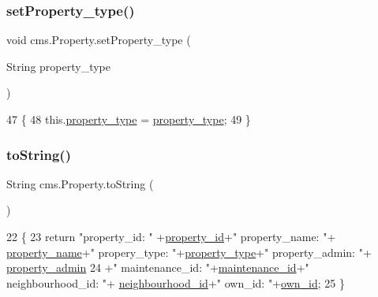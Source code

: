 \subsubsection{\texorpdfstring{set\+Property\+\_\+type()}{setProperty\_type()}}
{\footnotesize\ttfamily void cms.\+Property.\+set\+Property\+\_\+type (\begin{DoxyParamCaption}\item[{String}]{property\+\_\+type }\end{DoxyParamCaption})\hspace{0.3cm}{\ttfamily [inline]}}


\begin{DoxyCode}
47                                                        \{
48         this.\mbox{\hyperlink{classcms_1_1_property_a16bbd8f821050042e83a42d814fc42cc}{property\_type}} = \mbox{\hyperlink{classcms_1_1_property_a16bbd8f821050042e83a42d814fc42cc}{property\_type}};
49     \}
\end{DoxyCode}
\mbox{\label{classcms_1_1_property_a89c15a4d47d9b1ff2870465759e71d35}} 
\subsubsection{\texorpdfstring{to\+String()}{toString()}}
{\footnotesize\ttfamily String cms.\+Property.\+to\+String (\begin{DoxyParamCaption}{ }\end{DoxyParamCaption})\hspace{0.3cm}{\ttfamily [inline]}}


\begin{DoxyCode}
22                             \{
23         \textcolor{keywordflow}{return}  \textcolor{stringliteral}{"property\_id: "} +\mbox{\hyperlink{classcms_1_1_property_a599f759f4e0076578bf5a39c494a978d}{property\_id}}+\textcolor{stringliteral}{" property\_name: "}+
      \mbox{\hyperlink{classcms_1_1_property_a35fcc951b43bfcb151fae422a0a61a1a}{property\_name}}+\textcolor{stringliteral}{" propery\_type: "}+\mbox{\hyperlink{classcms_1_1_property_a16bbd8f821050042e83a42d814fc42cc}{property\_type}}+\textcolor{stringliteral}{" property\_admin: "}+
      \mbox{\hyperlink{classcms_1_1_property_a24082a4e64c157c5ef3b9238f58dba4c}{property\_admin}}
24                 +\textcolor{stringliteral}{" maintenance\_id: "}+\mbox{\hyperlink{classcms_1_1_property_a8da95f059e18d03376e179cbe5861043}{maintenance\_id}}+\textcolor{stringliteral}{" neighbourhood\_id: "}+
      \mbox{\hyperlink{classcms_1_1_property_a68a7a76b323d88f8ddcc351265e7fd25}{neighbourhood\_id}}+\textcolor{stringliteral}{" own\_id: "}+\mbox{\hyperlink{classcms_1_1_property_aa764bfa22c7dcc85bfdbc152dcf1a9f7}{own\_id}};
25     \}
\end{DoxyCode}


